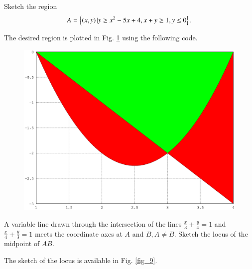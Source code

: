 \documentclass[journal,12pt,twocolumn]{IEEEtran}
\begin{document}
\renewcommand{\thefigure}{\theproblem}
\begin{problem}
Sketch the region
\begin{equation}
A = \left\{\left(x,y\right)\vert y \geq x^2-5x+4, x + y \geq 1, y \leq 0\right\}.
\end{equation}
%
\end{problem}
\solution The desired region is plotted in Fig. \ref{fig_8} using the following code.

\begin{figure}
\begin{center}
\includegraphics[width=\columnwidth]{./version_2/ee16b1008/ee16b1008}
\end{center}
\label{fig_8}	
\end{figure}
%
\begin{problem}
A variable line drawn through the intersection of the lines $\frac{x}{3} + \frac{y}{4} = 1$ and $\frac{x}{4} + \frac{y}{3} = 1$ meets the coordinate axes at $A$ and $B, A \neq B$.  Sketch the locus of the midpoint of $AB$.
\end{problem}
\solution

The sketch of the locus is available in Fig. \ref{fig_9}.

\end{document}
